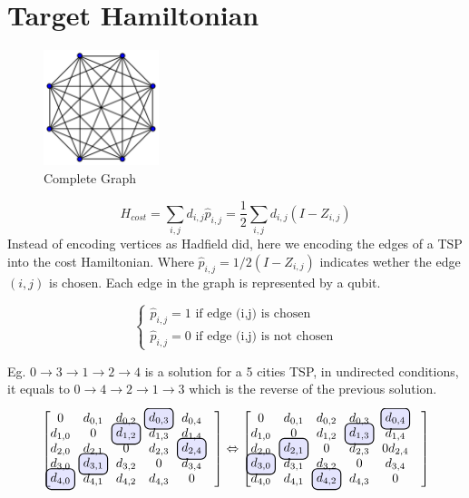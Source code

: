 \documentclass[a4paper, amsfonts, amssymb, amsmath, reprint, showkeys, nofootinbib, twoside]{revtex4-1}
\newcommand\hlight[1]{\tikz[overlay, remember picture,baseline=-\the\dimexpr\fontdimen22\textfont2\relax]\node[rectangle,fill=blue!50,rounded corners,fill opacity = 0.2,draw,thick,text opacity =1] {$#1$};}
\begin{document}
\section{Target Hamiltonian}
\begin{figure}[b]
    \centering
    \includegraphics[width=0.3\textwidth]{comp_graph.png}
    \caption{Complete Graph}
    \label{}
\end{figure}
$$
H_{cost}=\sum_{i,j} d_{i,j} \hat p_{i,j}=\frac{1}{2}\sum_{i,j} d_{i,j} (I-Z_{i,j})
$$
Instead of encoding vertices as Hadfield did, here we encoding the edges of a TSP into the cost Hamiltonian. Where $\hat p_{i,j}=1/2(I-Z_{i,j})$ indicates wether the edge $(i,j)$ is chosen. Each edge in the graph is represented by a qubit.

$$
\begin{cases}
    \hat p_{i,j}=1 \text{ if edge (i,j) is chosen} \\
    \hat p_{i,j}=0 \text{ if edge (i,j) is not chosen}
\end{cases} 
$$

Eg.
$0\rightarrow3\rightarrow1\rightarrow2\rightarrow4$ is a solution for a 5 cities TSP,
in undirected conditions, it equals to 
$0\rightarrow4\rightarrow2\rightarrow1\rightarrow3$ which is the reverse of the previous solution.

$$
\begin{bmatrix}
    0&d_{0,1}&d_{0,2}&\hlight{d_{0,3}}&d_{0,4}&\\
    d_{1,0}&0&\hlight{d_{1,2}}&d_{1,3}&d_{1,4}&\\
    d_{2,0}&d_{2,1}&0&d_{2,3}&\hlight{d_{2,4}}&\\
    d_{3,0}&\hlight{d_{3,1}}&d_{3,2}&0&d_{3,4}&\\
    \hlight{d_{4,0}}&d_{4,1}&d_{4,2}&d_{4,3}&0&\\
\end{bmatrix}
\Leftrightarrow
\begin{bmatrix}
    0&d_{0,1}&d_{0,2}&d_{0,3}&\hlight{d_{0,4}}&\\
    d_{1,0}&0&d_{1,2}&\hlight{d_{1,3}}&d_{1,4}&\\
    d_{2,0}&\hlight{d_{2,1}}&0&d_{2,3}&0d_{2,4}&\\
    \hlight{d_{3,0}}&d_{3,1}&d_{3,2}&0&d_{3,4}&\\
    d_{4,0}&d_{4,1}&\hlight{d_{4,2}}&d_{4,3}&0&\\
\end{bmatrix}
$$
\end{document}
